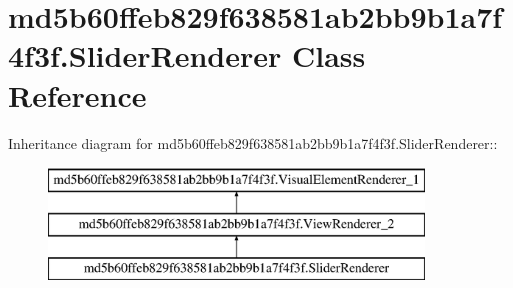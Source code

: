 \hypertarget{classmd5b60ffeb829f638581ab2bb9b1a7f4f3f_1_1_slider_renderer}{
\section{md5b60ffeb829f638581ab2bb9b1a7f4f3f.SliderRenderer Class Reference}
\label{classmd5b60ffeb829f638581ab2bb9b1a7f4f3f_1_1_slider_renderer}
}
Inheritance diagram for md5b60ffeb829f638581ab2bb9b1a7f4f3f.SliderRenderer::\begin{figure}[H]
\begin{center}
\leavevmode
\includegraphics[height=3cm]{classmd5b60ffeb829f638581ab2bb9b1a7f4f3f_1_1_slider_renderer}
\end{center}
\end{figure}
